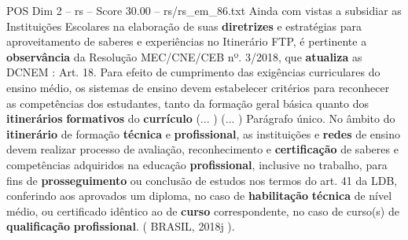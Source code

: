 \begin{textsample}{POS Dim 2 – rs – Score 30.00 – rs/rs\_em\_86.txt}
Ainda com vistas a subsidiar as Instituições Escolares na elaboração de suas \textbf{diretrizes} e estratégias para aproveitamento de saberes e experiências no Itinerário FTP, é pertinente a \textbf{observância} da Resolução MEC/CNE/CEB nº. 3/2018, que \textbf{atualiza} as DCNEM : Art. 18.
Para efeito de cumprimento das exigências curriculares do ensino médio, os sistemas de ensino devem estabelecer critérios para reconhecer as competências dos estudantes, tanto da formação geral básica quanto dos \textbf{itinerários} \textbf{formativos} do \textbf{currículo} (... ) (... ) Parágrafo único.
No âmbito do \textbf{itinerário} de formação \textbf{técnica} e \textbf{profissional}, as instituições e \textbf{redes} de ensino devem realizar processo de avaliação, reconhecimento e \textbf{certificação} de saberes e competências adquiridos na educação \textbf{profissional}, inclusive no trabalho, para fins de \textbf{prosseguimento} ou conclusão de estudos nos termos do art. 41 da LDB, conferindo aos aprovados um diploma, no caso de \textbf{habilitação} \textbf{técnica} de nível médio, ou certificado idêntico ao de \textbf{curso} correspondente, no caso de curso(s) de \textbf{qualificação} \textbf{profissional}. ( BRASIL, 2018j ).

\end{textsample}
